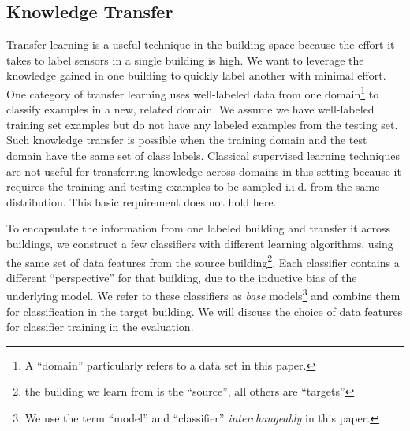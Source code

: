 \subsection{Knowledge Transfer}
Transfer learning is a useful technique in the building space because the effort it takes to label sensors in a single building is 
high.  We want to leverage the knowledge gained in one building to quickly label another with minimal effort.  
One category of transfer learning uses well-labeled data from one domain\footnote{A ``domain'' particularly refers to a data set in this paper.}  
to classify examples in a new, related domain.
We assume we have well-labeled training set examples but do not have any labeled examples from the testing set. 
Such knowledge transfer is possible when the training domain and the test domain have the same set of class labels. 
Classical supervised learning techniques are not useful for transferring knowledge across domains in this setting because 
it requires the training and testing examples to be sampled i.i.d. from the same distribution. This basic requirement does not hold here.

To encapsulate the information from one labeled building and transfer it across buildings, we construct a few classifiers with different 
learning algorithms, using the same set of data features from the source building\footnote{the building we learn from is the ``source'', all others are ``targets''}.   
Each classifier contains a different ``perspective'' for that building, due to the inductive bias of the underlying model. 
We refer to these classifiers as {\it base} models\footnote{We use the term ``model'' and ``classifier'' {\it interchangeably} in this paper.} and combine them for 
classification in the target building.
We will discuss the choice of data features for classifier training in the evaluation.


